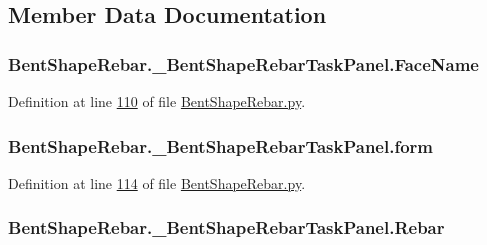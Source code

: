 \subsection{Member Data Documentation}
\subsubsection[{\texorpdfstring{Face\+Name}{FaceName}}]{\setlength{\rightskip}{0pt plus 5cm}Bent\+Shape\+Rebar.\+\_\+\+Bent\+Shape\+Rebar\+Task\+Panel.\+Face\+Name}\hypertarget{classBentShapeRebar_1_1__BentShapeRebarTaskPanel_a499514a87885d4c9462e3c6dc314ec9c}{}\label{classBentShapeRebar_1_1__BentShapeRebarTaskPanel_a499514a87885d4c9462e3c6dc314ec9c}


Definition at line \hyperlink{BentShapeRebar_8py_source_l00110}{110} of file \hyperlink{BentShapeRebar_8py_source}{Bent\+Shape\+Rebar.\+py}.

\subsubsection[{\texorpdfstring{form}{form}}]{\setlength{\rightskip}{0pt plus 5cm}Bent\+Shape\+Rebar.\+\_\+\+Bent\+Shape\+Rebar\+Task\+Panel.\+form}\hypertarget{classBentShapeRebar_1_1__BentShapeRebarTaskPanel_acbe07c5ace61552cc4e4899b668d93e5}{}\label{classBentShapeRebar_1_1__BentShapeRebarTaskPanel_acbe07c5ace61552cc4e4899b668d93e5}


Definition at line \hyperlink{BentShapeRebar_8py_source_l00114}{114} of file \hyperlink{BentShapeRebar_8py_source}{Bent\+Shape\+Rebar.\+py}.

\subsubsection[{\texorpdfstring{Rebar}{Rebar}}]{\setlength{\rightskip}{0pt plus 5cm}Bent\+Shape\+Rebar.\+\_\+\+Bent\+Shape\+Rebar\+Task\+Panel.\+Rebar}\hypertarget{classBentShapeRebar_1_1__BentShapeRebarTaskPanel_aae8fd4e66d675c566d0afcee0af2341f}{}\label{classBentShapeRebar_1_1__BentShapeRebarTaskPanel_aae8fd4e66d675c566d0afcee0af2341f}


